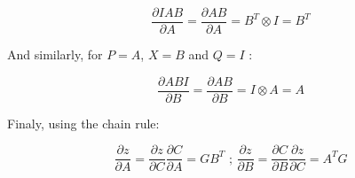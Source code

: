 \begin{equation}
  \frac{\partial IAB}{\partial A} = \frac{\partial AB}{\partial A} = B^T \otimes I = B^T
\end{equation}

And similarly, for $P = A$, $X = B$ and $Q = I$ :

\begin{equation}
  \frac{\partial ABI}{\partial B} = \frac{\partial AB}{\partial B} = I \otimes A = A
\end{equation}

Finaly, using the chain rule:

\begin{equation}
  \frac{\partial z}{\partial A} = \frac{\partial z}{\partial C}
  \frac{\partial C}{\partial A} = GB^T \text{ ; } \frac{\partial z}{\partial B}
  = \frac{\partial C}{\partial B} \frac{\partial z}{\partial C} = A^TG
\end{equation}


